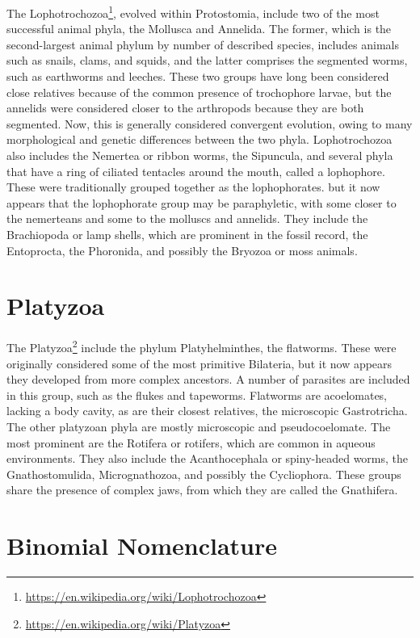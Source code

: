 \documentclass[]{book}
\let\rmarkdownfootnote\footnote%
\def\footnote{\protect\rmarkdownfootnote}
\renewcommand{\href}[2]{#2\footnote{\url{#1}}}
\theoremstyle{definition}
\theoremstyle{definition}
\theoremstyle{definition}
\theoremstyle{remark}
\begin{document}
\begin{enumerate}
The \href{https://en.wikipedia.org/wiki/Lophotrochozoa}{Lophotrochozoa},
evolved within Protostomia, include two of the most successful animal
phyla, the Mollusca and Annelida. The former, which is the
second-largest animal phylum by number of described species, includes
animals such as snails, clams, and squids, and the latter comprises the
segmented worms, such as earthworms and leeches. These two groups have
long been considered close relatives because of the common presence of
trochophore larvae, but the annelids were considered closer to the
arthropods because they are both segmented. Now, this is generally
considered convergent evolution, owing to many morphological and genetic
differences between the two phyla. Lophotrochozoa also includes the
Nemertea or ribbon worms, the Sipuncula, and several phyla that have a
ring of ciliated tentacles around the mouth, called a lophophore. These
were traditionally grouped together as the lophophorates. but it now
appears that the lophophorate group may be paraphyletic, with some
closer to the nemerteans and some to the molluscs and annelids. They
include the Brachiopoda or lamp shells, which are prominent in the
fossil record, the Entoprocta, the Phoronida, and possibly the Bryozoa
or moss animals.

\section{Platyzoa}\label{platyzoa}

The \href{https://en.wikipedia.org/wiki/Platyzoa}{Platyzoa} include the
phylum Platyhelminthes, the flatworms. These were originally considered
some of the most primitive Bilateria, but it now appears they developed
from more complex ancestors. A number of parasites are included in this
group, such as the flukes and tapeworms. Flatworms are acoelomates,
lacking a body cavity, as are their closest relatives, the microscopic
Gastrotricha. The other platyzoan phyla are mostly microscopic and
pseudocoelomate. The most prominent are the Rotifera or rotifers, which
are common in aqueous environments. They also include the Acanthocephala
or spiny-headed worms, the Gnathostomulida, Micrognathozoa, and possibly
the Cycliophora. These groups share the presence of complex jaws, from
which they are called the Gnathifera. 

\section{Binomial Nomenclature}\label{binomial-nomenclature}


\end{enumerate}
\end{document}
